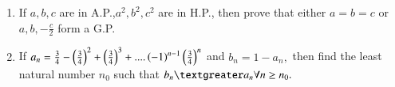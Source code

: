 \documentclass[journal,12pt,twocolumn]{IEEEtran}
\theoremstyle{remark}
\begin{document}
\begin{enumerate}
		\hfill {}                             
     
	\item If $a,b,c$ are in A.P.,$a^{2},b^{2},c^{2} $ are in H.P., then prove that either $ a=b=c $ or $a,b,-\frac{c}{2}$ form a G.P. 
		                    
		\hfill {}                            

	\item If $ a_n=\frac{3}{4}-\left(\frac{3}{4}\right)^{2}+\left(\frac{3}{4}\right)^{3}+....\left(-1\right)^{n-1}\left(\frac{3}{4}\right)^{n} $ and $ b_{n}=1-a_{n}, $ then find the least natural number $n_{0}$ such that $ b_{n} \textgreater a_{n} \forall n \geq n_{0}. $ 
		             
		\hfill {}                             
 \end{enumerate} 
\end{document}
